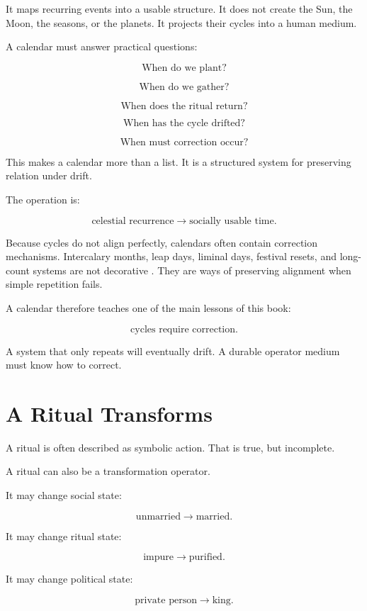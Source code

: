 \documentclass[11pt]{book}
\begin{document}
It maps recurring events into a usable structure. It does not create the Sun, the Moon, the seasons, or the planets. It projects their cycles into a human medium.

A calendar must answer practical questions:

\[
\text{When do we plant?}
\]

\[
\text{When do we gather?}
\]

\[
\text{When does the ritual return?}
\]

\[
\text{When has the cycle drifted?}
\]

\[
\text{When must correction occur?}
\]

This makes a calendar more than a list. It is a structured system for preserving relation under drift.

The operation is:

\[
\text{celestial recurrence}
\longrightarrow
\text{socially usable time}.
\]

Because cycles do not align perfectly, calendars often contain correction mechanisms. Intercalary months, leap days, liminal days, festival resets, and long-count systems are not decorative \cite{Aveni1989EmpiresTime,BrickerBricker2011AstronomyMayaCodices,Parker1950CalendarsEgypt}. They are ways of preserving alignment when simple repetition fails.

A calendar therefore teaches one of the main lessons of this book:

\[
\text{cycles require correction}.
\]

A system that only repeats will eventually drift. A durable operator medium must know how to correct.

\section{A Ritual Transforms}

A ritual is often described as symbolic action. That is true, but incomplete.

A ritual can also be a transformation operator.

It may change social state:

\[
\text{unmarried} \longrightarrow \text{married}.
\]

It may change ritual state:

\[
\text{impure} \longrightarrow \text{purified}.
\]

It may change political state:

\[
\text{private person} \longrightarrow \text{king}.
\]
\end{document}
